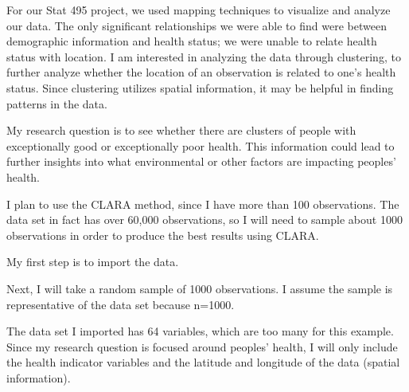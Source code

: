 \documentclass[12pt,twoside]{amherstthesis}
\begin{document}
  For our Stat 495 project, we used mapping techniques to visualize and
  analyze our data. The only significant relationships we were able to
  find were between demographic information and health status; we were
  unable to relate health status with location. I am interested in
  analyzing the data through clustering, to further analyze whether the
  location of an observation is related to one's health status. Since
  clustering utilizes spatial information, it may be helpful in finding
  patterns in the data.
  
  My research question is to see whether there are clusters of people with
  exceptionally good or exceptionally poor health. This information could
  lead to further insights into what environmental or other factors are
  impacting peoples' health.
  
  I plan to use the CLARA method, since I have more than 100 observations.
  The data set in fact has over 60,000 observations, so I will need to
  sample about 1000 observations in order to produce the best results
  using CLARA.
  
  My first step is to import the data.
  
  Next, I will take a random sample of 1000 observations. I assume the
  sample is representative of the data set because n=1000.
  
  \begin{Shaded}
  \begin{Highlighting}[]
  \NormalTok{(}\NormalTok{)}
  \StringTok{ }\NormalTok{data_subset[}\NormalTok{(}\OperatorTok{:}\NormalTok{,}
     \NormalTok{),]}
  \end{Highlighting}
  \end{Shaded}
  
  The data set I imported has 64 variables, which are too many for this
  example. Since my research question is focused around peoples' health, I
  will only include the health indicator variables and the latitude and
  longitude of the data (spatial information).
  
  \begin{Shaded}
  \begin{Highlighting}[]
  \StringTok{ }\NormalTok{(}\NormalTok{, }\NormalTok{, }\NormalTok{, }
              \NormalTok{, }\NormalTok{, }\NormalTok{)}
  \StringTok{ }
  \end{Highlighting}
  \end{Shaded}
  
\end{document}
